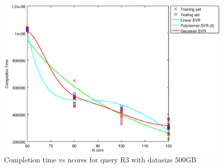 
\begin {figure}[hbtp]
\centering
\includegraphics[width=\textwidth]{output/R3_500_ONLY_1_OVER_NCORES/plot_R3_500_bestmodels.eps}
\caption{Completion time vs ncores for query R3 with datasize 500GB}
\label{fig:all_nonlinear_R3_500}
\end {figure}
